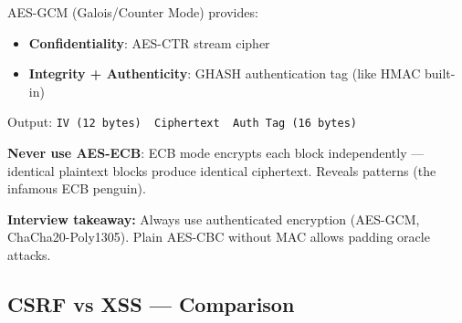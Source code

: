 \documentclass[11pt]{article}
\providecommand{\tightlist}{\setlength{\itemsep}{1pt}\setlength{\parskip}{0pt}}
\begin{document}
AES-GCM (Galois/Counter Mode) provides:

\begin{itemize}
\tightlist
\item
  \textbf{Confidentiality}: AES-CTR stream cipher
\item
  \textbf{Integrity + Authenticity}: GHASH authentication tag (like HMAC built-in)
\end{itemize}

Output: \texttt{IV\ (12\ bytes)\ \textbar{}\textbar{}\ Ciphertext\ \textbar{}\textbar{}\ Auth\ Tag\ (16\ bytes)}

\textbf{Never use AES-ECB}: ECB mode encrypts each block independently --- identical plaintext blocks produce identical ciphertext. Reveals patterns (the infamous ECB penguin).

\textbf{Interview takeaway:} Always use authenticated encryption (AES-GCM, ChaCha20-Poly1305). Plain AES-CBC without MAC allows padding oracle attacks.

\subsection{CSRF vs XSS --- Comparison}\label{csrf-vs-xss--comparison}
\end{document}

